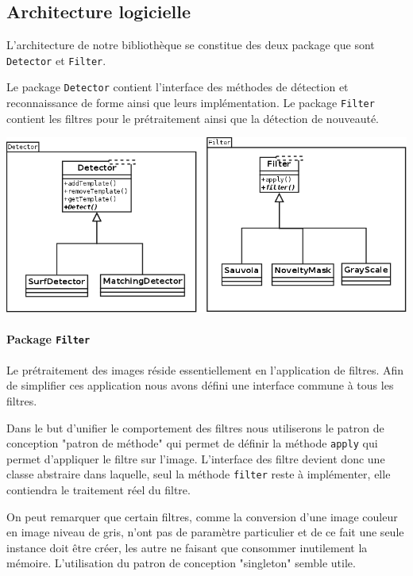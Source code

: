 \subsection{Architecture logicielle}

L'architecture de notre bibliothèque se constitue des deux package que sont \texttt{Detector} et \texttt{Filter}.

Le package \texttt{Detector} contient l'interface des méthodes de détection et reconnaissance de forme ainsi que leurs implémentation.
Le package \texttt{Filter} contient les filtres pour le prétraitement ainsi que la détection de nouveauté.


\begin{center}
\includegraphics[width=\textwidth]{Archi/Architecture.png}
\end{center}

\paragraph{Package \texttt{Filter}\\}
Le prétraitement des images réside essentiellement en l'application de filtres. Afin de simplifier ces application nous avons défini une interface commune à tous les filtres. 

Dans le but d'unifier le comportement des filtres nous utiliserons le patron de conception "patron de méthode" qui permet de définir la méthode \texttt{apply} qui permet d'appliquer le filtre sur l'image. 
L'interface des filtre devient donc une classe abstraire dans laquelle, seul la méthode \texttt{filter} reste à implémenter, elle contiendra le traitement réel du filtre.

On peut remarquer que certain filtres, comme la conversion d'une image couleur en image niveau de gris, n'ont pas de paramètre particulier et de ce fait une seule instance doit être créer, les autre ne faisant que consommer inutilement la mémoire. L'utilisation du patron de conception "singleton" semble utile.

